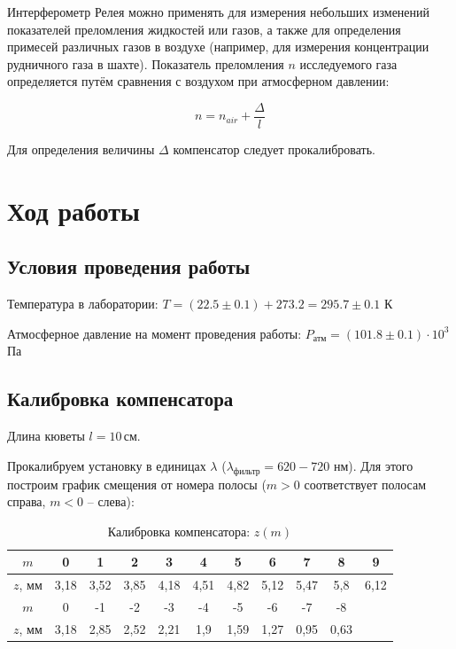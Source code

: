 	Интерферометр Релея можно применять для измерения небольших изменений показателей преломления жидкостей или газов, а также для определения примесей различных газов в воздухе (например, для измерения концентрации рудничного газа в шахте). Показатель преломления $n$ исследуемого газа определяется путём сравнения с воздухом при атмосферном давлении:

\begin{equation}
n = n_{air} + \frac{\Delta}{l}
\label{co2}
\end{equation}

	Для определения величины $\Delta$ компенсатор следует прокалибровать.

\newpage
\section{Ход работы}

\subsection{Условия проведения работы}

Температура в лаборатории: $T = (22.5\pm0.1) + 273.2 = 295.7 \pm 0.1$ К

Атмосферное давление на момент проведения работы: $P_{\text{атм}} = (101.8 \pm 0.1)\cdot 10^3$ Па

\subsection{Калибровка компенсатора}

Длина кюветы $l = 10 \,\text{см}$.

Прокалибруем установку в единицах $\lambda$ ($\lambda_{\text{фильтр}} = 620-720$ нм). Для этого построим график смещения от номера полосы ($m>0$ соответствует полосам справа, $m<0$ -- слева):
	
\begin{table}[!ht]
    \centering
    \caption{Калибровка компенсатора: $z(m)$}
    \begin{tabular}{|c|c|c|c|c|c|c|c|c|c|c|}
    \hline
        $m$ & 0 & 1 & 2 & 3 & 4 & 5 & 6 & 7 & 8 & 9  \\ \hline
        $z$, мм & 3,18 & 3,52 & 3,85 & 4,18 & 4,51 & 4,82 & 5,12 & 5,47 & 5,8 & 6,12  \\ \hline
        $m$ & 0 & -1 & -2 & -3 & -4 & -5 & -6 & -7 & -8 &   \\ \hline
        $z$, мм & 3,18 & 2,85 & 2,52 & 2,21 & 1,9 & 1,59 & 1,27 & 0,95 & 0,63 &   \\ \hline
    \end{tabular}
    \label{calibr}
\end{table}

